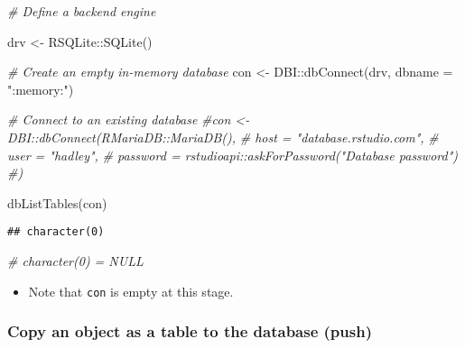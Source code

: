 \documentclass[
]{book}
\newenvironment{Shaded}{\begin{snugshade}}{\end{snugshade}}
\newcommand{\AttributeTok}[1]{\textcolor[rgb]{0.77,0.63,0.00}{#1}}
\newcommand{\CommentTok}[1]{\textcolor[rgb]{0.56,0.35,0.01}{\textit{#1}}}
\newcommand{\FunctionTok}[1]{\textcolor[rgb]{0.00,0.00,0.00}{#1}}
\newcommand{\NormalTok}[1]{#1}
\newcommand{\OtherTok}[1]{\textcolor[rgb]{0.56,0.35,0.01}{#1}}
\newcommand{\SpecialCharTok}[1]{\textcolor[rgb]{0.00,0.00,0.00}{#1}}
\newcommand{\StringTok}[1]{\textcolor[rgb]{0.31,0.60,0.02}{#1}}
\providecommand{\tightlist}{%
  \setlength{\itemsep}{0pt}\setlength{\parskip}{0pt}}
\begin{document}
\begin{Shaded}
\begin{Highlighting}[]
\CommentTok{\# Define a backend engine }

\NormalTok{drv }\OtherTok{\textless{}{-}}\NormalTok{ RSQLite}\SpecialCharTok{::}\FunctionTok{SQLite}\NormalTok{()}

\CommentTok{\# Create an empty in{-}memory database }
\NormalTok{con }\OtherTok{\textless{}{-}}\NormalTok{ DBI}\SpecialCharTok{::}\FunctionTok{dbConnect}\NormalTok{(drv, }
                      \AttributeTok{dbname =} \StringTok{":memory:"}\NormalTok{)}

\CommentTok{\# Connect to an existing database }
\CommentTok{\#con \textless{}{-} DBI::dbConnect(RMariaDB::MariaDB(), }
 \CommentTok{\# host = "database.rstudio.com",}
 \CommentTok{\# user = "hadley",}
 \CommentTok{\# password = rstudioapi::askForPassword("Database password")}
\CommentTok{\#)}

\FunctionTok{dbListTables}\NormalTok{(con)}
\end{Highlighting}
\end{Shaded}

\begin{verbatim}
## character(0)
\end{verbatim}

\begin{Shaded}
\begin{Highlighting}[]
\CommentTok{\# character(0) = NULL}
\end{Highlighting}
\end{Shaded}

\begin{itemize}
\tightlist
\item
  Note that \texttt{con} is empty at this stage.
\end{itemize}

\hypertarget{copy-an-object-as-a-table-to-the-database-push}{%
\subsubsection{Copy an object as a table to the database (push)}\label{copy-an-object-as-a-table-to-the-database-push}}
\end{document}
